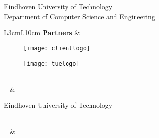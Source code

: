 \begin{titlepage}
\color{black}
\centering
\huge
\doctitle\\
\vspace{1cm}
\Large
\docsubtitle\\
\vspace{1cm}
\normalsize
Eindhoven University of Technology\\
Department of Computer Science and Engineering

\justify
\begin{table}[!b]
    \begin{tabular}{L{3cm}L{10cm}}
    \textbf{Partners}			& 
    \begin{figure}[H]
    	\begin{minipage}{\compLogoWidth}
    		\texttt{[image: clientlogo]}
    	\end{minipage}
    	\begin{minipage}{\tueLogoWidth}
    		\texttt{[image: tuelogo]}
    	\end{minipage}
    	\end{figure}    									
	\\
	~ &
    	\begin{minipage}{\compLogoWidth}
    		\client
    	\end{minipage}
    	\begin{minipage}{\tueLogoWidth}
		Eindhoven University of Technology
    	\end{minipage}
    	\\
    ~ & ~\\
\end{tabular}
\end{table}
\end{titlepage}
